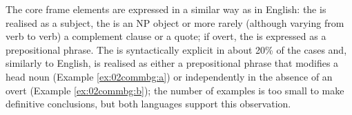 \documentclass[output=paper,colorlinks,citecolor=brown]{langscibook}
\begin{document}

The core frame elements are expressed in a similar way as in English: the  is realised as a subject, the  is an NP object or more rarely (although varying from verb to verb) a complement clause or a quote; if overt, the  is expressed as a prepositional phrase. The  is syntactically explicit in about 20\% of the cases and, similarly to English, is realised as either a prepositional phrase that modifies a  head noun (Example \ref{ex:02commbg:a}) or independently in the absence of an overt  (Example \ref{ex:02commbg:b}); the number of examples is too small to make definitive conclusions, but both languages support this observation. 
\end{document}
